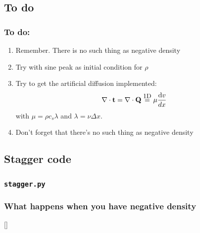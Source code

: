 \documentclass{beamer}
\newcommand{\diffd}{\ensuremath{\text{d}}}
\newcommand{\del}{\ensuremath{\nabla}}
\begin{document}
\subsection{To do}
\begin{frame}
    \frametitle{To do:}

    \begin{enumerate}
        \item Remember. There is no such thing as negative density
        \item Try with sine peak as initial condition for $\rho$
        \item Try to get the artificial diffusion implemented:
            \begin{equation}
                \del \cdot \mathbf{t} = \del \cdot \mathbf{Q} \stackrel{\text{\small 1D}}{=} \mu \frac{\diffd v}{dx}
                \label{eq:diffusion}
            \end{equation}
            with $\mu = \rho c_s \lambda$ and $\lambda = \nu \Delta x$.
        \item Don't forget that there's no such thing as negative density
    \end{enumerate}

\end{frame}

\subsection{Stagger code}
\begin{frame}[fragile,shrink=40]
    \frametitle{\texttt{stagger.py}}
    
\end{frame}

\begin{frame}
    \frametitle{What happens when you have negative density}
    \href{http://77.237.250.152/wordpress/studier/blowup_web.mp4}[]

    \begin{center}
    \end{center}


\end{frame}

\end{document}
